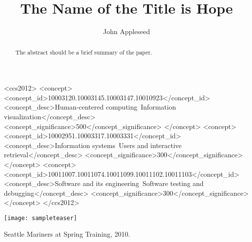 \documentclass[manuscript,screen,review]{_acm/acmart}
\begin{document}
\title{The Name of the Title is Hope}

\author{John Appleseed}

\renewcommand{\shortauthors}{Appleseed, et al.}

\begin{abstract}
  The abstract should be a brief summary of the paper.
\end{abstract}

\begin{CCSXML}
<ccs2012>
  <concept>
    <concept_id>10003120.10003145.10003147.10010923</concept_id>
    <concept_desc>Human-centered computing~Information visualization</concept_desc>
    <concept_significance>500</concept_significance>
  </concept>
  <concept>
    <concept_id>10002951.10003317.10003331</concept_id>
    <concept_desc>Information systems~Users and interactive retrieval</concept_desc>
    <concept_significance>300</concept_significance>
    </concept>
  <concept>
    <concept_id>10011007.10011074.10011099.10011102.10011103</concept_id>
    <concept_desc>Software and its engineering~Software testing and debugging</concept_desc>
    <concept_significance>300</concept_significance>
  </concept>
</ccs2012>
\end{CCSXML}




\begin{teaserfigure}
  \texttt{[image: sampleteaser]}
  \caption{Seattle Mariners at Spring Training, 2010.}
  \label{fig:teaser}
\end{teaserfigure}




\maketitle
\end{document}

